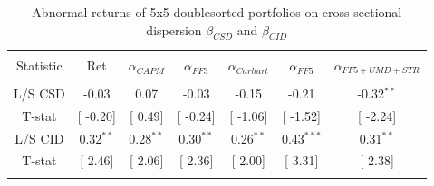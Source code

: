 \documentclass[12pt]{article}
\begin{document}
\begin{table}[!htbp] \centering 
  \caption{Abnormal returns of 5x5 doublesorted portfolios on cross-sectional dispersion $\beta_{CSD}$ and $\beta_{CID}$} 
  \label{} 
\begin{tabular}{@{\extracolsep{5pt}} ccccccc} 
\\[-1.8ex]\hline 
\hline \\[-1.8ex] 
Statistic & Ret & $\alpha_{CAPM}$ & $\alpha_{FF3}$ & $\alpha_{Carhart}$ & $\alpha_{FF5}$ & $\alpha_{FF5+UMD+STR}$ \\  
\hline \\[-1.8ex] 
L/S CSD & -0.03 & 0.07 & -0.03 & -0.15 & -0.21 & -0.32$^{**}$ \\ 
T-stat & [ -0.20] & [ 0.49] & [ -0.24] & [ -1.06] & [ -1.52] & [ -2.24] \\ 
L/S CID & 0.32$^{**}$ & 0.28$^{**}$ & 0.30$^{**}$ & 0.26$^{**}$ & 0.43$^{***}$ & 0.31$^{**}$ \\ 
T-stat & [ 2.46] & [ 2.06] & [ 2.36] & [ 2.00] & [ 3.31] & [ 2.38] \\ 
\hline \\[-1.8ex] 
\end{tabular} 
\end{table}
\end{document}
